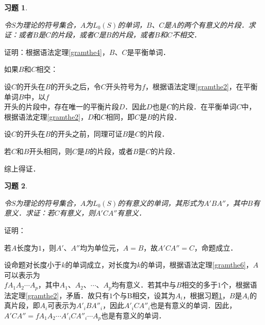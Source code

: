 \documentclass[12pt, a4paper, oneside]{book}
\newtheorem{exer}{习题}
\begin{document}
			\begin{exer}\label{exer28}
				\hfill\par
				令$S$为理论的符号集合，$A$为$L_0(S)$的单词，$B$、$C$是$A$的两个有意义的片段．求证：或者$B$是$C$的片段，或者$C$是$B$的片段，或者$B$和$C$不相交．
			\end{exer}
			证明：根据语法定理\ref{gramthe4}，$B$、$C$是平衡单词．
			\par
			如果$B$和$C$相交：
			\par
			设$C$的开头在$B$的开头之后，令$C$开头符号为$f$，根据语法定理\ref{gramthe2}，在平衡单词$B$中，以$f$\\开头的片段中，存在唯一的平衡片段$D$．因此$D$也是$C$的片段．在平衡单词$C$中，根据语法定理\ref{gramthe2}，$D$和$C$相同，即$C$是$B$的片段．
			\par
			设$C$的开头在$B$的开头之前，同理可证$B$是$C$的片段．
			\par
			若$C$和$B$开头相同，则$C$是$B$的片段，或者$B$是$C$的片段．
			\par
			综上得证．
			
			\begin{exer}\label{exer29}
				\hfill\par
				令$S$为理论的符号集合，$A$为$L_0(S)$的有意义的单词，其形式为$A'BA''$，其中$B$有意义．求证：若$C$有意义，则$A'CA''$有意义．
			\end{exer}
			证明：
			\par
			若$A$长度为$1$，则$A'$、$A''$均为单位元，$A=B$，故$A'CA''=C$，命题成立．
			\par
			设命题对长度小于$k$的单词成立，对长度为$k$的单词，根据语法定理\ref{gramthe6}，$A$可以表示为\\$fA_1A_2\cdots A_p$，其中$A_1$、$A_2$、$\cdots$、$A_p$均有意义．若其中与$B$相交的多于$1$个，根据语法定理\ref{gramthe2}，矛盾．故只有$1$个与B相交，设其为$A_i$，根据习题\ref{exer28}，$B$是$A_i$的真片段，即$A_i$可表示为${A'}_iB{A''}_i$，因此${A'}_iC{A''}_i$也是有意义的单词．因此，$A'CA''=fA_1A_2\cdots {A'}_iC{A''}_i\cdots A_p$也是有意义的单词．
\end{document}
